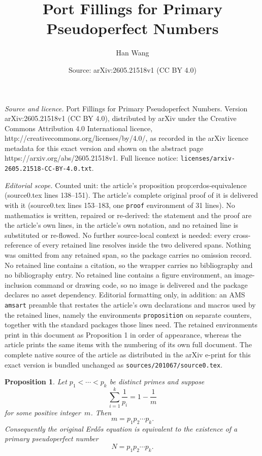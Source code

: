\documentclass[10pt,a4paper]{amsart}
\title{Port Fillings for Primary Pseudoperfect Numbers}
\author{Han Wang}
\date{Source: arXiv:2605.21518v1 (CC BY 4.0)}
\newtheorem{proposition}{Proposition}
\begin{document}
\maketitle

\noindent\emph{Source and licence.} Port Fillings for Primary Pseudoperfect Numbers. Version arXiv:2605.21518v1 (CC BY 4.0), distributed by arXiv under the Creative Commons Attribution 4.0 International licence, http://creativecommons.org/licenses/by/4.0/, as recorded in the arXiv licence metadata for this exact version and shown on the abstract page https://arxiv.org/abs/2605.21518v1. Full licence notice: \texttt{licenses/arxiv-2605.21518-CC-BY-4.0.txt}.\par\smallskip

\noindent\textit{Editorial scope.} Counted unit: the article's proposition prop:erdos-equivalence (source0.tex lines 138--151). The article's complete original proof of it is delivered with it (source0.tex lines 153--183, one \texttt{proof} environment of 31 lines). No mathematics is written, repaired or re-derived: the statement and the proof are the article's own lines, in the article's own notation, and no retained line is substituted or re-flowed.  No further source-local context is needed: every cross-reference of every retained line resolves inside the two delivered spans.  Nothing was omitted from any retained span, so the package carries no omission record.  No retained line contains a citation, so the wrapper carries no bibliography and no bibliography entry.  No retained line contains a figure environment, an image-inclusion command or drawing code, so no image is delivered and the package declares no asset dependency.  Editorial formatting only, in addition: an AMS \texttt{amsart} preamble that restates the article's own declarations and macros used by the retained lines, namely the environments \texttt{proposition} on separate counters, together with the standard packages those lines need.  The retained environments print in this document as Proposition 1 in order of appearance, whereas the article prints the same items with the numbering of its own full document.  The complete native source of the article as distributed in the arXiv e-print for this exact version is bundled unchanged as \texttt{sources/201067/source0.tex}.
\begin{proposition}\label{prop:erdos-equivalence}
Let $p_1<\cdots<p_k$ be distinct primes and suppose
\[
        \sum_{i=1}^k\frac1{p_i}=1-\frac1m
\]
for some positive integer~$m$.  Then
\[
        m=p_1p_2\cdots p_k.
\]
Consequently the original Erd\H{o}s equation is equivalent to the existence of a primary pseudoperfect number
\[
        N=p_1p_2\cdots p_k.
\]
\end{proposition}
\end{document}
